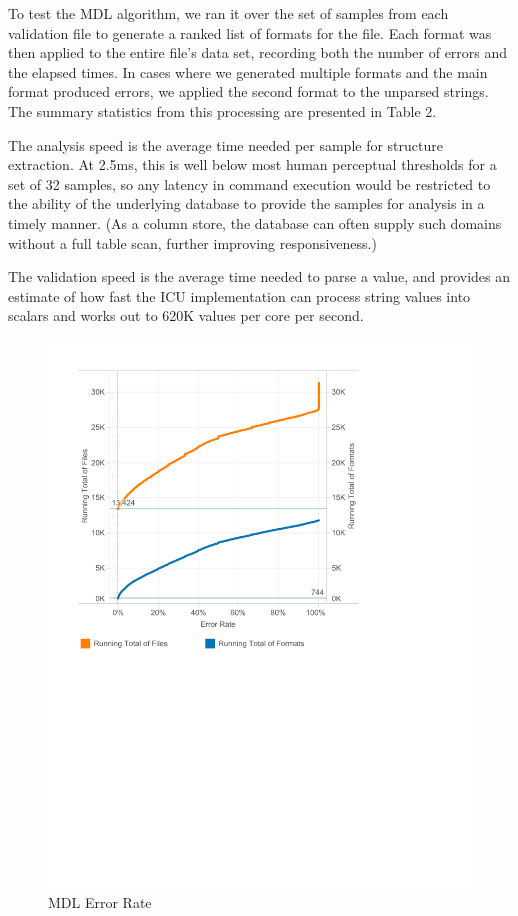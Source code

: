 To test the MDL algorithm, we ran it over the set of samples from each validation file to generate a ranked list of formats for the file. Each format was then applied to the entire file's data set, recording both the number of errors and the elapsed times. In cases where we generated multiple formats and the main format produced errors, we applied the second format to the unparsed strings. The summary statistics from this processing are presented in Table 2.

The analysis speed is the average time needed per sample for structure extraction. At 2.5ms, this is well below most human perceptual thresholds for a set of 32 samples, so any latency in command execution would be restricted to the ability of the underlying database to provide the samples for analysis in a timely manner. (As a column store, the database can often supply such domains without a full table scan, further improving responsiveness.) 

The validation speed is the average time needed to parse a value, and provides an estimate of how fast the ICU implementation can process string values into scalars and works out to 620K values per core per second.\\
 
\begin{figure}[ht]
\centering
\includegraphics[width=\columnwidth]{figures/FigureM2}
\caption{MDL Error Rate}
\label{fig:M2}
\end{figure}


